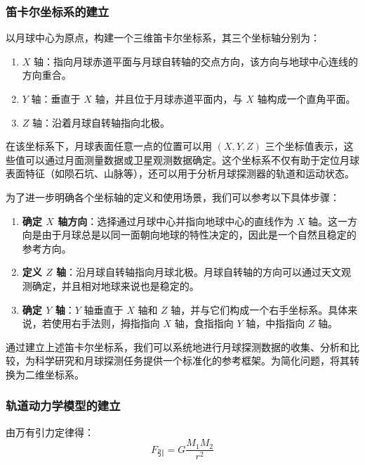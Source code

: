 \documentclass{ctexart}
\begin{document}
    \subsubsection{笛卡尔坐标系的建立}
以月球中心为原点，构建一个三维笛卡尔坐标系，其三个坐标轴分别为：

\begin{enumerate}
    \item \(X\) 轴：指向月球赤道平面与月球自转轴的交点方向，该方向与地球中心连线的方向重合。
    \item \(Y\) 轴：垂直于 \(X\) 轴，并且位于月球赤道平面内，与 \(X\) 轴构成一个直角平面。
    \item \(Z\) 轴：沿着月球自转轴指向北极。
\end{enumerate}

在该坐标系下，月球表面任意一点的位置可以用 \((X, Y, Z)\) 三个坐标值表示，这些值可以通过月面测量数据或卫星观测数据确定。这个坐标系不仅有助于定位月球表面特征（如陨石坑、山脉等），还可以用于分析月球探测器的轨道和运动状态。

为了进一步明确各个坐标轴的定义和使用场景，我们可以参考以下具体步骤：

\begin{enumerate}
    \item \textbf{确定 \(X\) 轴方向}：选择通过月球中心并指向地球中心的直线作为 \(X\) 轴。这一方向是由于月球总是以同一面朝向地球的特性决定的，因此是一个自然且稳定的参考方向。
    \item \textbf{定义 \(Z\) 轴}：沿月球自转轴指向月球北极。月球自转轴的方向可以通过天文观测确定，并且相对地球来说也是稳定的。
    \item \textbf{确定 \(Y\) 轴}：\(Y\) 轴垂直于 \(X\) 轴和 \(Z\) 轴，并与它们构成一个右手坐标系。具体来说，若使用右手法则，拇指指向 \(X\) 轴，食指指向 \(Y\) 轴，中指指向 \(Z\) 轴。
\end{enumerate}

通过建立上述笛卡尔坐标系，我们可以系统地进行月球探测数据的收集、分析和比较，为科学研究和月球探测任务提供一个标准化的参考框架。为简化问题，将其转换为二维坐标系。
    \subsubsection{轨道动力学模型的建立}


由万有引力定律得：
\begin{equation}
F_{\text{引}} = G \frac{M_1 M_2}{r^2}
\label{eq:gravity}
\end{equation}
\end{document}

